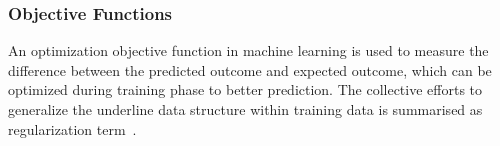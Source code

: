 \subsubsection{Objective Functions}
An optimization objective function in machine learning is used to measure the difference between the predicted outcome and expected outcome, which can be optimized during training phase to  better prediction. The collective efforts to generalize the underline data structure within training data is summarised as regularization term~\cite{goodfellow_2015}.  